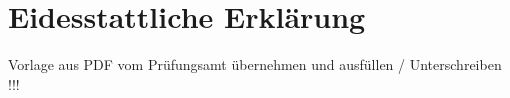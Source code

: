 \documentclass[../Bachelorarbeit.tex]{subfiles}
\begin{document}
\section*{Eidesstattliche Erklärung}
\color{red}
Vorlage aus PDF vom Prüfungsamt übernehmen und ausfüllen / Unterschreiben !!!
\end{document}
